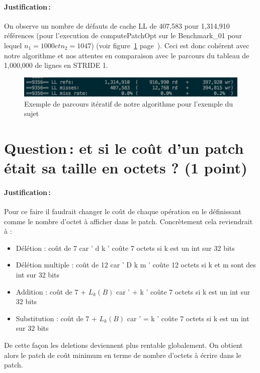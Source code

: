 \documentclass[a4paper, 10pt, french]{article}
\begin{document}
\paragraph{Justification\,: }
	{ 
	On observe un nombre de défauts de cache LL de 407,583 pour 1,314,910 références (pour l'execution de computePatchOpt sur le Benchmark\_01 pour lequel $n_1=1000 et n_2=1047$) (voir figure~\ref{cccc} page~\pageref{cccc}). 
Ceci est donc cohérent avec notre algorithme et nos attentes en comparaison avec le parcours du tableau de 1,000,000 de lignes en STRIDE 1.
    	\begin{figure}[!h]
\hspace{1cm}
	\includegraphics[scale=0.6]{cache_LL.png}
	\caption{\label{cccc} Exemple de parcours itératif de notre algorithme pour l'exemple du sujet}
\end{figure}
     }

\section{Question\,: et  si le coût d'un patch était sa taille en octets ? (1 point)}
\paragraph{Justification\,: }
{
Pour ce faire il faudrait changer le coût de chaque opération en le définissant comme le nombre d'octet à afficher dans le patch.
Concrètement cela reviendrait à :
\begin{itemize}
	\item Délétion : coût de 7 car ' d k '  coûte 7 octets si k est un int sur 32 bits
	\item Délétion multiple : coût de 12 car ' D k m ' coûte 12 octets si k et m sont des int sur 32 bits
	\item Addition : coût de 7 + $L_k(B)$ car ' + k ' coûte 7 octets si k est un int sur 32 bits
	\item Substitution : coût de 7 + $L_k(B)$ car ' = k ' coûte 7 octets si k est un int sur 32 bits
\end{itemize}
De cette façon les deletions deviennent plus rentable globalement. On obtient alors le patch de coût minimum en terme de nombre d'octets à écrire dans le patch.

}
\end{document}
